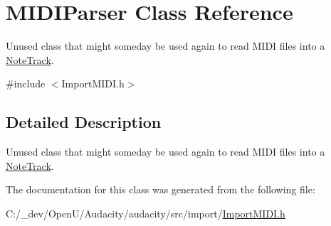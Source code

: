 \hypertarget{class_m_i_d_i_parser}{}\section{M\+I\+D\+I\+Parser Class Reference}
\label{class_m_i_d_i_parser}


Unused class that might someday be used again to read M\+I\+DI files into a \hyperlink{class_note_track}{Note\+Track}.  




{\ttfamily \#include $<$Import\+M\+I\+D\+I.\+h$>$}



\subsection{Detailed Description}
Unused class that might someday be used again to read M\+I\+DI files into a \hyperlink{class_note_track}{Note\+Track}. 

The documentation for this class was generated from the following file\+:\begin{DoxyCompactItemize}
\item 
C\+:/\+\_\+dev/\+Open\+U/\+Audacity/audacity/src/import/\hyperlink{_import_m_i_d_i_8h}{Import\+M\+I\+D\+I.\+h}\end{DoxyCompactItemize}
